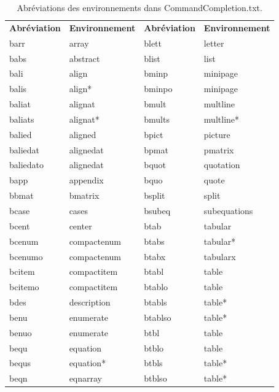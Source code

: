 \documentclass[11pt,french]{article}
\newcommand{\CCT}{\textsf{CommandCompletion.txt}}
\begin{document}
\begin{table}
\small
\centering
\caption{Abréviations des environnements dans \CCT.\label{tbl:environments}}
\begin{tabular}{llll}
\textbf{Abréviation} & \textbf{Environnement} & \textbf{Abréviation} & \textbf{Environnement} \\
\cmidrule[0.5pt](lr){1-1} \cmidrule[0.5pt](lr){2-2} \cmidrule[0.5pt](lr){3-3} \cmidrule[0.5pt](lr){4-4}
barr      & array       & blett   & letter \\
babs      & abstract    & blist   & list \\
bali      & align       & bminp   & minipage \\
balis     & align*      & bminpo  & minipage \\
baliat    & alignat     & bmult   & multline \\
baliats   & alignat*    & bmults  & multline* \\
balied    & aligned     & bpict   & picture \\
baliedat  & alignedat   & bpmat   & pmatrix \\
baliedato & alignedat   & bquot   & quotation \\
bapp      & appendix    & bquo    & quote \\
bbmat     & bmatrix     & bsplit  & split \\
bcase     & cases       & bsubeq  & subequations \\
bcent     & center      & btab    & tabular \\
bcenum    & compactenum & btabs   & tabular* \\
bcenumo   & compactenum & btabx   & tabularx \\
bcitem    & compactitem & btabl   & table \\
bcitemo   & compactitem & btablo  & table \\
bdes      & description & btabls  & table* \\
benu      & enumerate   & btablso & table* \\
benuo     & enumerate   & btbl    & table \\
bequ      & equation    & btblo   & table \\
bequs     & equation*   & btbls   & table* \\
beqn      & eqnarray    & btblso  & table* \\

\end{tabular}
\end{table}
\end{document}
